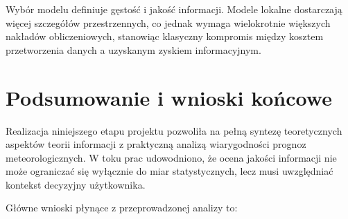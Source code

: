 \documentclass[a4paper,12pt]{article}
\begin{document}
Wybór modelu definiuje gęstość i jakość informacji. Modele lokalne dostarczają więcej szczegółów przestrzennych, co jednak wymaga wielokrotnie większych nakładów obliczeniowych, stanowiąc klasyczny kompromis między kosztem przetworzenia danych a uzyskanym zyskiem informacyjnym.





\newpage



\section{Podsumowanie i wnioski końcowe}

Realizacja niniejszego etapu projektu pozwoliła na pełną syntezę teoretycznych aspektów teorii informacji z praktyczną analizą wiarygodności prognoz meteorologicznych. W toku prac udowodniono, że ocena jakości informacji nie może ograniczać się wyłącznie do miar statystycznych, lecz musi uwzględniać kontekst decyzyjny użytkownika.

Główne wnioski płynące z przeprowadzonej analizy to:
\end{document}
